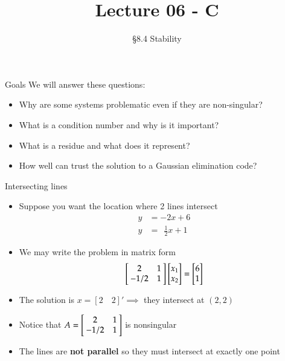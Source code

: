 \documentclass[10pt]{beamer}
\title[Math/CS 375]{Lecture 06 - C}
\subtitle{\S 8.4 Stability}
\begin{document}
\begin{frame}
  \titlepage
\end{frame}
\begin{frame}{Goals}
We will answer these questions:\\[3mm]
\begin{itemize}
    \item Why are some systems problematic even if they are non-singular? 
    \item What is a condition number and why is it important? 
    \item What is a residue and what does it represent?
    \item How well can trust the solution to a Gaussian elimination code?
\end{itemize}
\end{frame}
\begin{frame}{Intersecting lines}
\begin{itemize}
    \item Suppose you want the location where 2 lines intersect 
\begin{align*}
    y &= -2x + 6 \\
    y &= \ \ \frac{1}{2} x + 1
\end{align*}
\item We may write the problem in matrix form
\begin{equation*}
    \left[\negthickspace\begin{array}{cr} 2 & 1 \\ -1/2 & 1 \end{array}\negthickspace\right]
    \begin{bmatrix} x_1 \\ x_2 \end{bmatrix}
    =
    \begin{bmatrix} 6 \\ 1 \end{bmatrix}
\end{equation*}
\item The solution is $x=[2\quad 2]' \implies $ they intersect at $(2,2)$

\item Notice that $A=\left[\negthickspace\begin{array}{cr} 2 & 1 \\ -1/2 & 1 \end{array}\negthickspace\right]$ is nonsingular

\item The lines are \textbf{not parallel} so they must intersect at exactly one point

\end{itemize}
\end{frame}
\end{document}
